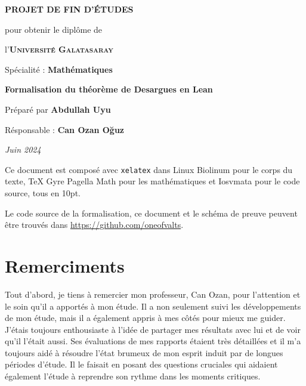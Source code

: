 \documentclass[fleqn, leqno, a4paper, openright, twoside, 11pt]{memoir}
\makeatletter
\newcommand\iraggedright{%
  \let\\\@centercr\@rightskip\@flushglue \rightskip\@rightskip
  \leftskip\z@skip}
\theoremstyle{definition}
\theoremstyle{remark}
\makeatother
\begin{document}
\frontmatter
\pagestyle{empty}
\begin{center}
  \vspace*{\fill}
  

  \vspace{1cm}
  \large{\textbf{PROJET DE FIN D'ÉTUDES}}

  \vspace{0.5cm}
  {\small pour obtenir le diplôme de}

  \vspace{0.5cm}
  l'\textsc{\textbf{Université Galatasaray}}

  {\small Spécialité : \textbf{Mathématiques}}

  \vspace{0.75cm}
  {\Large\textbf{Formalisation du théorème de Desargues en Lean}}

  \vspace{0.75cm}
  Préparé par \textbf{Abdullah Uyu}

  Résponsable : \textbf{Can Ozan Oğuz}

  \vspace*{\fill}
  \textit{Juin 2024}
  \vspace*{\fill}
\end{center}
\iraggedright
\raggedbottom
\clearpage
\null{}
\vfill{}
Ce document est composé avec \texttt{xelatex} dans Linux Biolinum pour le
corps du texte, TeX Gyre Pagella Math pour les mathématiques et Iosvmata
pour le code source, tous en 10pt.

Le code source de la formalisation, ce document et le schéma de preuve
peuvent être trouvés dans \url{https://github.com/oneofvalts}.
\chapter*{Remerciments}
Tout d'abord, je tiens à remercier mon professeur, Can Ozan, pour
l'attention et le soin qu'il a apportés à mon étude. Il a non seulement
suivi les développements de mon étude, mais il a également appris à mes
côtés pour mieux me guider. J'étais toujours enthousiaste à l'idée de
partager mes résultats avec lui et de voir qu'il l'était aussi. Ses
évaluations de mes rapports étaient très détaillées et il m'a toujours
aidé à résoudre l'état brumeux de mon esprit induit par de longues
périodes d'étude. Il le faisait en posant des questions cruciales qui
aidaient également l'étude à reprendre son rythme dans les moments
critiques.
\end{document}
